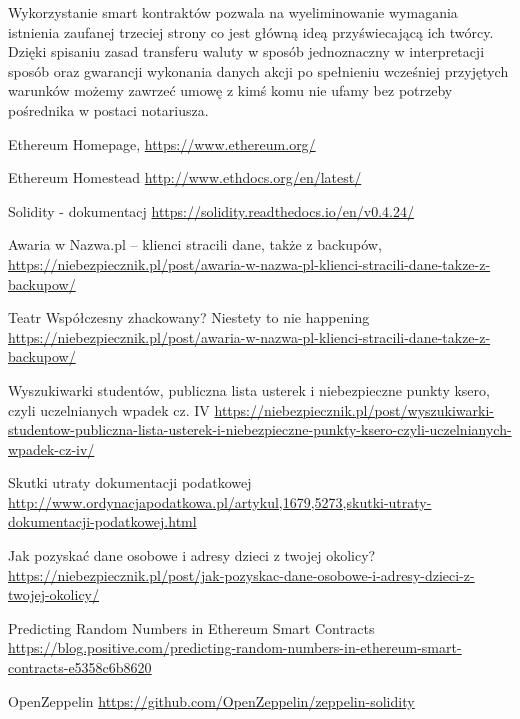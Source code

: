 \documentclass[]{llncs}
\begin{document}
  Wykorzystanie smart kontraktów pozwala na wyeliminowanie wymagania istnienia
  zaufanej trzeciej strony co jest główną ideą przyświecającą ich twórcy. Dzięki
  spisaniu zasad transferu waluty w sposób jednoznaczny w interpretacji sposób
  oraz gwarancji wykonania danych akcji po spełnieniu wcześniej przyjętych
  warunków możemy zawrzeć umowę z kimś komu nie ufamy bez potrzeby pośrednika w
  postaci notariusza.

%
%
%
% 
% 
%
\begin{thebibliography}{splncs04}
   Ethereum Homepage,
  \url{https://www.ethereum.org/}

   Ethereum Homestead
  \url{http://www.ethdocs.org/en/latest/}

   Solidity - dokumentacj
  \url{https://solidity.readthedocs.io/en/v0.4.24/}

   Awaria w Nazwa.pl – klienci stracili dane, także z backupów,
  \url{https://niebezpiecznik.pl/post/awaria-w-nazwa-pl-klienci-stracili-dane-takze-z-backupow/}

   Teatr Współczesny zhackowany? Niestety to nie happening
  \url{https://niebezpiecznik.pl/post/awaria-w-nazwa-pl-klienci-stracili-dane-takze-z-backupow/}

   Wyszukiwarki studentów, publiczna lista usterek i niebezpieczne punkty ksero, czyli uczelnianych wpadek cz. IV
  \url{https://niebezpiecznik.pl/post/wyszukiwarki-studentow-publiczna-lista-usterek-i-niebezpieczne-punkty-ksero-czyli-uczelnianych-wpadek-cz-iv/}

   Skutki utraty dokumentacji podatkowej
  \url{http://www.ordynacjapodatkowa.pl/artykul,1679,5273,skutki-utraty-dokumentacji-podatkowej.html}

   Jak pozyskać dane osobowe i adresy dzieci z twojej okolicy?
  \url{https://niebezpiecznik.pl/post/jak-pozyskac-dane-osobowe-i-adresy-dzieci-z-twojej-okolicy/}

   Predicting Random Numbers in Ethereum Smart Contracts
  \url{https://blog.positive.com/predicting-random-numbers-in-ethereum-smart-contracts-e5358c6b8620}

   OpenZeppelin
  \url{https://github.com/OpenZeppelin/zeppelin-solidity}

\end{thebibliography}
\end{document}
